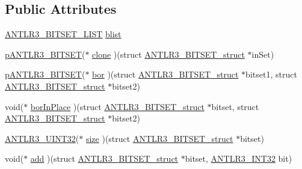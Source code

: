 \subsection*{Public Attributes}
\begin{DoxyCompactItemize}
\item 
\hyperlink{antlr3bitset_8h_add99ea122b4de93f00a7f090e435fa40}{A\-N\-T\-L\-R3\-\_\-\-B\-I\-T\-S\-E\-T\-\_\-\-L\-I\-S\-T} \hyperlink{struct_a_n_t_l_r3___b_i_t_s_e_t__struct_ae602429f83ab8519882b446e81f7167b}{blist}
\item 
\hyperlink{antlr3interfaces_8h_ab15ce244874643afe4a952daf417f744}{p\-A\-N\-T\-L\-R3\-\_\-\-B\-I\-T\-S\-E\-T}($\ast$ \hyperlink{struct_a_n_t_l_r3___b_i_t_s_e_t__struct_a2285d8dc3d04b4eae8986908897a86f4}{clone} )(struct \hyperlink{struct_a_n_t_l_r3___b_i_t_s_e_t__struct}{A\-N\-T\-L\-R3\-\_\-\-B\-I\-T\-S\-E\-T\-\_\-struct} $\ast$in\-Set)
\item 
\hyperlink{antlr3interfaces_8h_ab15ce244874643afe4a952daf417f744}{p\-A\-N\-T\-L\-R3\-\_\-\-B\-I\-T\-S\-E\-T}($\ast$ \hyperlink{struct_a_n_t_l_r3___b_i_t_s_e_t__struct_a244506d05f6346631b9437b5f4aad2e4}{bor} )(struct \hyperlink{struct_a_n_t_l_r3___b_i_t_s_e_t__struct}{A\-N\-T\-L\-R3\-\_\-\-B\-I\-T\-S\-E\-T\-\_\-struct} $\ast$bitset1, struct \hyperlink{struct_a_n_t_l_r3___b_i_t_s_e_t__struct}{A\-N\-T\-L\-R3\-\_\-\-B\-I\-T\-S\-E\-T\-\_\-struct} $\ast$bitset2)
\item 
void($\ast$ \hyperlink{struct_a_n_t_l_r3___b_i_t_s_e_t__struct_a4354623d1e7f563c84a8ad2c6839db25}{bor\-In\-Place} )(struct \hyperlink{struct_a_n_t_l_r3___b_i_t_s_e_t__struct}{A\-N\-T\-L\-R3\-\_\-\-B\-I\-T\-S\-E\-T\-\_\-struct} $\ast$bitset, struct \hyperlink{struct_a_n_t_l_r3___b_i_t_s_e_t__struct}{A\-N\-T\-L\-R3\-\_\-\-B\-I\-T\-S\-E\-T\-\_\-struct} $\ast$bitset2)
\item 
\hyperlink{antlr3defs_8h_ac41f744abd0fd25144b9eb9d11b1dfd1}{A\-N\-T\-L\-R3\-\_\-\-U\-I\-N\-T32}($\ast$ \hyperlink{struct_a_n_t_l_r3___b_i_t_s_e_t__struct_a3a0ba96ff9cff13ee102c33382175dd2}{size} )(struct \hyperlink{struct_a_n_t_l_r3___b_i_t_s_e_t__struct}{A\-N\-T\-L\-R3\-\_\-\-B\-I\-T\-S\-E\-T\-\_\-struct} $\ast$bitset)
\item 
void($\ast$ \hyperlink{struct_a_n_t_l_r3___b_i_t_s_e_t__struct_acafdf986cd95396e1f22e41f1e59c46a}{add} )(struct \hyperlink{struct_a_n_t_l_r3___b_i_t_s_e_t__struct}{A\-N\-T\-L\-R3\-\_\-\-B\-I\-T\-S\-E\-T\-\_\-struct} $\ast$bitset, \hyperlink{antlr3defs_8h_a6faef5c4687f8eb633d2aefea93973ca}{A\-N\-T\-L\-R3\-\_\-\-I\-N\-T32} bit)
\item 

\end{DoxyCompactItemize}
